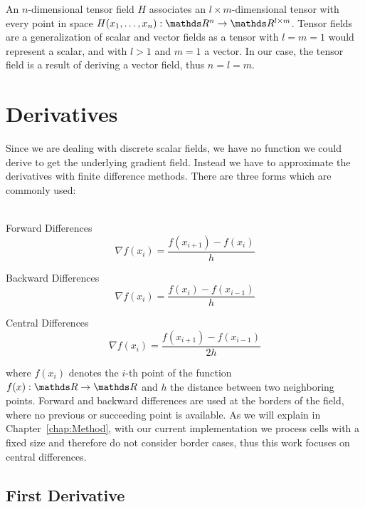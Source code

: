 An $n$-dimensional tensor field $H$ associates an $l \times
m$-dimensional tensor with every point in space $H(x_1,\dots,x_n):
\real^n \rightarrow \real^{l \times m}$. Tensor fields are a
generalization of scalar and vector fields as a tensor with $l = m = 1$
would represent a scalar, and with $l > 1$ and $m = 1$ a vector. In our
case, the tensor field is a result of deriving a vector field, thus $n =
l = m$.

\section{Derivatives}

Since we are dealing with discrete scalar fields, we have no function we
could derive to get the underlying gradient field. Instead we have to
approximate the derivatives with finite difference methods. There are
three forms which are commonly used:\\
\\
\begin{inparaenum}[(a)]
  \item Forward Differences
  \begin{equation}
    \nabla f(x_i) = \frac{f(x_{i+1}) - f(x_i)}{h}
  \end{equation}
  \item Backward Differences
  \begin{equation}
    \nabla f(x_i) = \frac{f(x_i) - f(x_{i-1})}{h}
  \end{equation}
  \item Central Differences
  \begin{equation}\label{eq:centDiff}
    \nabla f(x_i) = \frac{f(x_{i+1}) - f(x_{i-1})}{2h}
  \end{equation}
\end{inparaenum}
where $f(x_i)$ denotes the $i$-th point of the function $f(x): \real
\rightarrow \real$ and $h$ the distance between two neighboring points.
Forward and backward differences are used at the borders of the field,
where no previous or succeeding point is available. As we will explain
in Chapter~\ref{chap:Method}, with our current implementation we process
cells with a fixed size and therefore do not consider border cases, thus
this work focuses on central differences.

\subsection{First Derivative}

